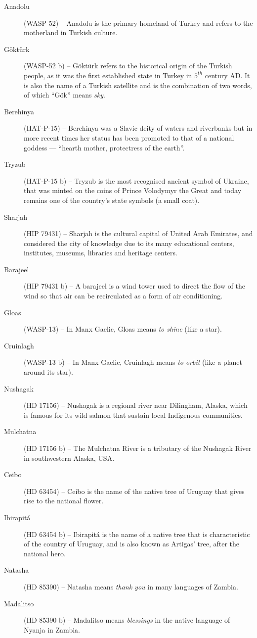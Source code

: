 \begin{description}
\item[Anadolu] (WASP-52) -- Anadolu is the primary homeland of Turkey and refers to the motherland in Turkish culture.
\item[Göktürk] (WASP-52 b) -- Göktürk refers to the historical origin of the Turkish people, as it was the first established state in Turkey in $5^{th}$ century AD. It is also the name of a Turkish satellite and is the combination of two words, of which ``Gök'' means \textit{sky}.
\item[Berehinya] (HAT-P-15) -- Berehinya was a Slavic deity of waters and riverbanks but in more recent times her status has been promoted to that of a national goddess — ``hearth mother, protectress of the earth''.
\item[Tryzub] (HAT-P-15 b) -- Tryzub is the most recognised ancient symbol of Ukraine, that was minted on the coins of Prince Volodymyr the Great and today remains one of the country's state symbols (a small coat).
\item[Sharjah] (HIP 79431) -- Sharjah is the cultural capital of United Arab Emirates, and considered the city of knowledge due to its many educational centers, institutes, museums, libraries and heritage centers.
\item[Barajeel] (HIP 79431 b) -- A barajeel is a wind tower used to direct the flow of the wind so that air can be recirculated as a form of air conditioning.
\item[Gloas] (WASP-13) -- In Manx Gaelic, Gloas means \textit{to shine} (like a star).
\item[Cruinlagh] (WASP-13 b) -- In Manx Gaelic, Cruinlagh means \textit{to orbit} (like a planet around its star).
\item[Nushagak] (HD 17156) -- Nushagak is a regional river near Dilingham, Alaska, which is famous for its wild salmon that sustain local Indigenous communities.
\item[Mulchatna] (HD 17156 b) -- The Mulchatna River is a tributary of the Nushagak River in southwestern Alaska, USA.
\item[Ceibo] (HD 63454) -- Ceibo is the name of the native tree of Uruguay that gives rise to the national flower.
\item[Ibirapitá] (HD 63454 b) -- Ibirapitá is the name of a native tree that is characteristic of the country of Uruguay, and is also known as Artigas' tree, after the national hero.
\item[Natasha] (HD 85390) -- Natasha means \textit{thank you} in many languages of Zambia.
\item[Madalitso] (HD 85390 b) -- Madalitso means \textit{blessings} in the native language of Nyanja in Zambia.
\end{description}

